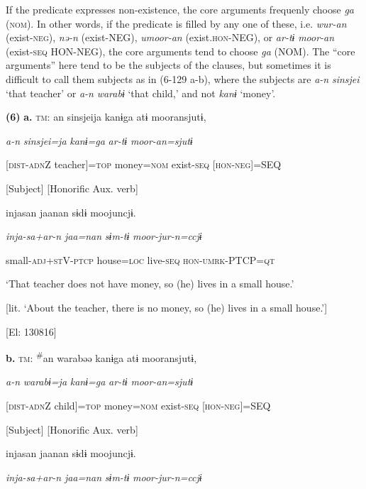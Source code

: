 If the predicate expresses non-existence, the core arguments frequenly choose \textit{ga} (\textsc{nom}). In other words, if the predicate is filled by any one of these, i.e. \textit{wur-an} (exist-\textsc{neg}), \textit{nə-n} (exist-NEG), \textit{umoor-an} (exist.\textsc{hon}-NEG), or \textit{ar-tɨ} \textit{moor-an} (exist-\textsc{seq} HON-NEG), the core arguments tend to choose \textit{ga} (NOM). The “core arguments” here tend to be the subjects of the clauses, but sometimes it is difficult to call them subjects as in (6-129 a-b), where the subjects are \textit{a-n} \textit{sinsjei} ‘that teacher’ or \textit{a-n} \textit{warabɨ} ‘that child,’ and not \textit{kanɨ} ‘money’.

\textbf{(6)}  \textbf{a.}  \textsc{tm}:  an  sinsjeija  kanɨga  atɨ  mooransjutɨ,

      \textit{a-n}  \textit{sinsjei=ja}  \textit{kanɨ=ga}  \textit{ar-tɨ}  \textit{moor-an=sjutɨ}

      [\textsc{dist}-\textsc{adn}Z  teacher]=\textsc{top}  money=\textsc{nom}  exist-\textsc{seq}  [\textsc{hon}-\textsc{neg}]=SEQ

      [Subject]      [Honorific Aux. verb]

      injasan  jaanan  sɨdɨ  moojuncjɨ.

      \textit{inja-sa+ar-n}  \textit{jaa=nan}  \textit{sɨm-tɨ}  \textit{moor-jur-n=ccjɨ}

      small-\textsc{adj}+\textsc{st}V-\textsc{ptcp}  house=\textsc{loc}  live-\textsc{seq}  \textsc{hon}-\textsc{umrk}-PTCP=\textsc{qt}

      ‘That teacher does not have money, so (he) lives in a small house.’

[lit. ‘About the teacher, there is no money, so (he) lives in a small house.’]

      [El: 130816]

  \textbf{b.}  \textsc{tm}:  \textsuperscript{\#}an  warabəə  kanɨga  atɨ  mooransjutɨ,

      \textit{a-n}  \textit{warabɨ=ja}  \textit{kanɨ=ga}  \textit{ar-tɨ}  \textit{moor-an=sjutɨ}

      [\textsc{dist}-\textsc{adn}Z  child]=\textsc{top}  money=\textsc{nom}  exist-\textsc{seq}  [\textsc{hon}-\textsc{neg}]=SEQ

      [Subject]      [Honorific Aux. verb]

      injasan  jaanan  sɨdɨ  moojuncjɨ.

      \textit{inja-sa+ar-n}  \textit{jaa=nan}  \textit{sɨm-tɨ}  \textit{moor-jur-n=ccjɨ}

